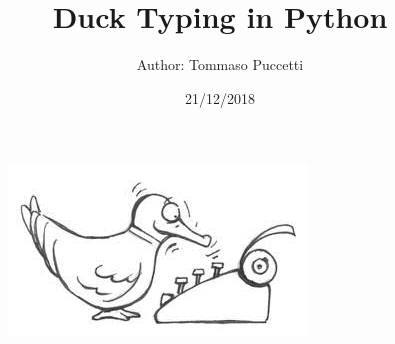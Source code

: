 \documentclass[xcolor ={table,usenames,dvipsnames}]{beamer}
\title{Duck Typing in Python}
\author{Author: Tommaso Puccetti}
\institute{Universit\`a  degli Studi di Firenze}
\date{21/12/2018}
\theoremstyle{definition}
\begin{document}
	
	\begin{frame}
		\maketitle
			\begin{figure}[h!]
			\centering
			\includegraphics[scale=2]{img/cartoonduck.jpg}
			\label{Interfacce di un CS}
		\end{figure}
	\end{frame}

\end{document}
